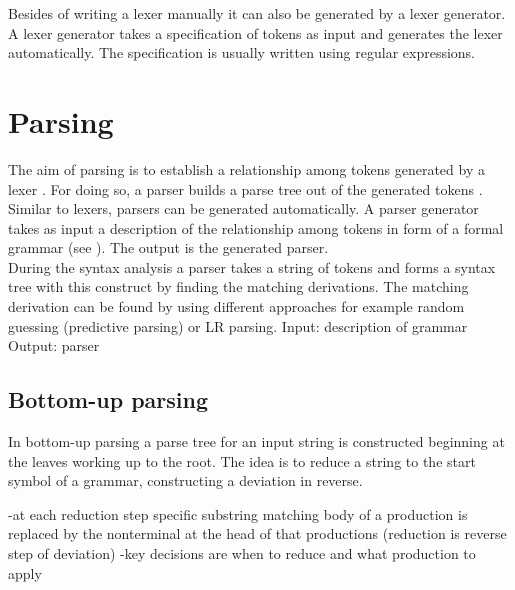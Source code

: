 Besides of writing a lexer manually it can also be generated by a lexer generator. A lexer generator takes a specification of tokens as input and generates the lexer automatically. 
The specification is usually written using regular expressions. 

\section{Parsing}\label{sec:BackgroundParser}
The aim of parsing is to establish a relationship among tokens generated by a lexer \cite{LexYacc.1992}. For doing so, a parser builds a parse tree out of the generated tokens \cite{Mogensen.2017}.\\
Similar to lexers, parsers can be generated automatically.
A parser generator takes as input a description of the relationship among tokens in form of a formal grammar (see ). The output is the generated parser. \cite{LexYacc.1992}\\
During the syntax analysis a parser takes a string of tokens and forms a syntax tree with this construct by finding the matching derivations. The matching derivation can be found by using different approaches for example random guessing (predictive parsing) or LR parsing.
Input: description of grammar \cite{LexYacc.1992}
Output: parser \cite{LexYacc.1992}

\subsection{Bottom-up parsing}\label{sec:BackgroundParserBottomUp}
In bottom-up parsing a parse tree for an input string is constructed beginning at the leaves working up to the root. The idea is to reduce a string to the start symbol of a grammar, constructing a deviation in reverse.
\cite{Aho.2007}

-at each reduction step specific substring matching body of a production is replaced by the nonterminal at the head of that productions (reduction is reverse step of deviation)
-key decisions are when to reduce and what production to apply

